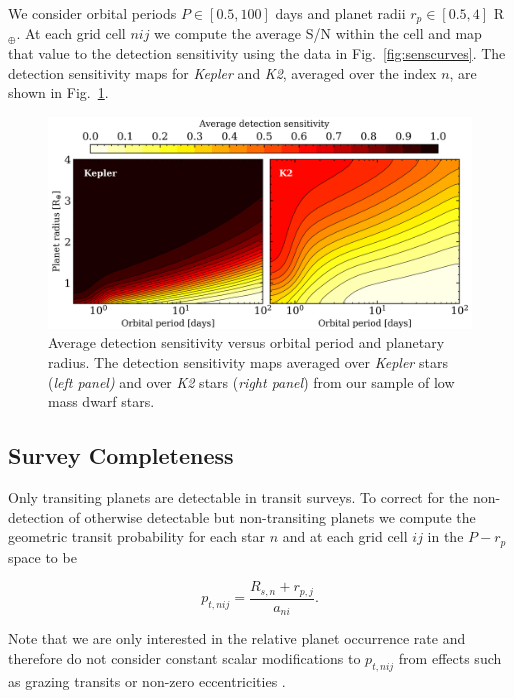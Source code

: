 \documentclass[twocolumn]{emulateapj}
\newcommand{\kepler}[1]{\emph{Kepler}#1}
\newcommand{\ktwo}[1]{\emph{K2}#1}
\begin{document}
We consider orbital periods $P \in [0.5,100]$ days and planet radii $r_p \in [0.5,4]$ R$_{\oplus}$. At
each grid cell $nij$ we compute the average S/N within the cell and map that value to the detection sensitivity
using the data in Fig.~\ref{fig:senscurves}. The detection sensitivity maps for \kepler{} and \ktwo{,}
averaged over the index $n$, are shown in Fig.~\ref{fig:sensmap}.

 

\begin{figure}
  \centering
  \includegraphics[width=0.98\hsize]{figures/sensmap.png}
  \caption{Average detection sensitivity versus orbital period and planetary radius.
    The detection sensitivity maps averaged over \kepler{} stars (\emph{left panel)} and over \ktwo{} stars
    (\emph{right panel}) from our sample of low mass dwarf stars.} 
  \label{fig:sensmap}
\end{figure}


\subsection{Survey Completeness}
Only transiting planets are detectable in transit surveys. To correct for the non-detection of otherwise
detectable but non-transiting planets we compute
the geometric transit probability for each star $n$ and at each grid cell $ij$ in the $P-r_p$ space to be

\begin{equation}
  p_{t,nij} = \frac{R_{s,n} + r_{p,j}}{a_{ni}}. \label{eq:ptransit}
\end{equation}

\noindent Note that we are only interested in the relative planet occurrence rate and therefore do not consider
constant scalar modifications to $p_{t,nij}$ from effects such as grazing transits or non-zero eccentricities 
\citep{barnes07b}.
\end{document}
